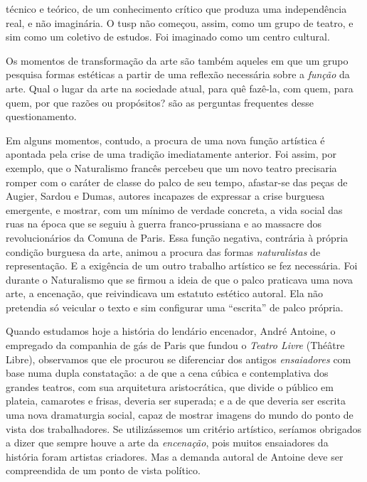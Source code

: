 \column
\noindent{}técnico e teórico, de um
conhecimento crítico que produza uma independência real, e não
imaginária. O {\sc tusp} não começou, assim, como um grupo de teatro, e sim
como um coletivo de estudos. Foi imaginado como um centro cultural.

\subject{Modelos históricos: vanguarda e formação}

Os momentos de transformação da arte são também aqueles em que um grupo
pesquisa formas estéticas a partir de uma reflexão necessária sobre a
{\it função} da arte. Qual o lugar da arte na sociedade atual, para quê
fazê-la, com quem, para quem, por que razões ou propósitos? são as
perguntas frequentes desse questionamento.

Em alguns momentos, contudo, a procura de uma nova função artística é
apontada pela crise de uma tradição imediatamente anterior. Foi assim,
por exemplo, que o Naturalismo francês percebeu que um novo teatro
precisaria romper com o caráter de classe do palco de seu tempo,
afastar-se das peças de Augier, Sardou e Dumas, autores incapazes de
expressar a crise burguesa emergente, e mostrar, com um mínimo de
verdade concreta, a vida social das ruas na época que se seguiu à guerra
franco-prussiana e ao massacre dos revolucionários da Comuna de Paris.
Essa função negativa, contrária à própria condição burguesa da arte,
animou a procura das formas {\it naturalistas} de representação. E a
exigência de um outro trabalho artístico se fez necessária. Foi durante
o Naturalismo que se firmou a ideia de que o palco praticava uma nova
arte, a encenação, que reivindicava um estatuto estético autoral. Ela
não pretendia só veicular o texto e sim configurar uma “escrita” de
palco própria.

Quando estudamos hoje a história do lendário encenador, André Antoine, o
empregado da companhia de gás de Paris que fundou o {\it Teatro Livre}
(Théâtre Libre), observamos que ele procurou se diferenciar dos antigos
{\it ensaiadores} com base numa dupla constatação: a de que a cena
cúbica e contemplativa dos grandes teatros, com sua arquitetura
aristocrática, que divide o público em plateia, camarotes e frisas,
deveria ser superada; e a de que deveria ser escrita uma nova
dramaturgia social, capaz de mostrar imagens do mundo do ponto de vista
dos trabalhadores. Se utilizássemos um critério artístico, seríamos
obrigados a dizer que sempre houve a arte da {\it encenação}, pois
muitos ensaiadores da história foram artistas criadores. Mas a demanda
autoral de Antoine deve ser compreendida de um ponto de vista político.

